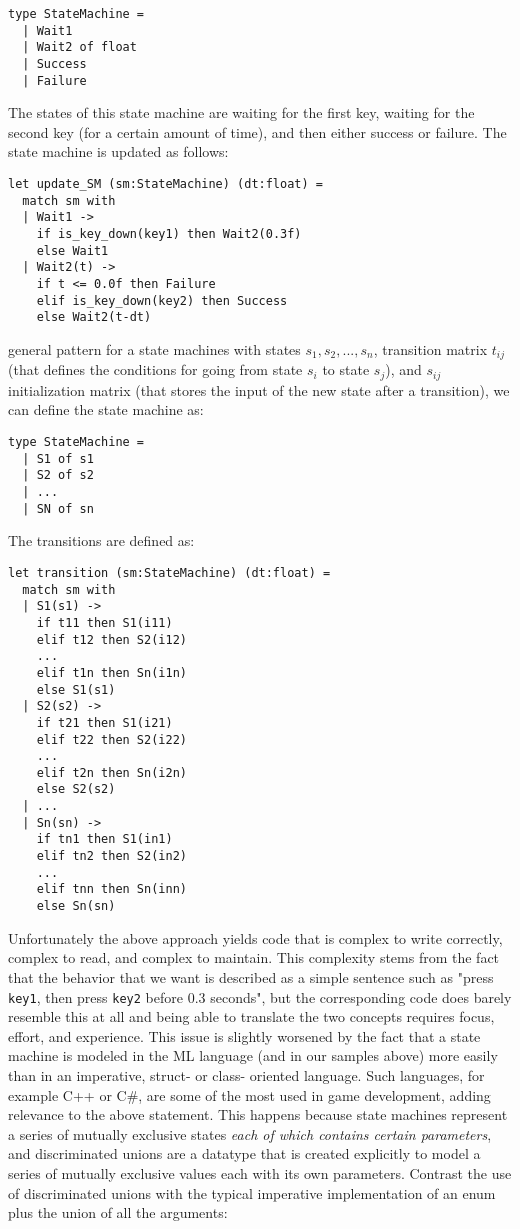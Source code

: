 \begin{lstlisting}
type StateMachine = 
  | Wait1
  | Wait2 of float
  | Success
  | Failure
\end{lstlisting}

The states of this state machine are waiting for the first key, waiting for the second key (for a certain amount of time), and then either success or failure. The state machine is updated as follows:

\begin{lstlisting}
let update_SM (sm:StateMachine) (dt:float) =
  match sm with
  | Wait1 ->
    if is_key_down(key1) then Wait2(0.3f)
    else Wait1
  | Wait2(t) ->
    if t <= 0.0f then Failure
    elif is_key_down(key2) then Success
    else Wait2(t-dt)
\end{lstlisting}

 general pattern for a state machines with states $s_1,s_2, ..., s_n$, transition matrix $t_{ij}$ (that defines the conditions for going from state $s_i$ to state $s_j$), and $s_{ij}$ initialization matrix (that stores the input of the new state after a transition), we can define the state machine as:

\begin{lstlisting}
type StateMachine = 
  | S1 of s1
  | S2 of s2
  | ...
  | SN of sn
\end{lstlisting}

The transitions are defined as:

\begin{lstlisting}
let transition (sm:StateMachine) (dt:float) =
  match sm with
  | S1(s1) -> 
    if t11 then S1(i11)
    elif t12 then S2(i12)
    ...
    elif t1n then Sn(i1n)
    else S1(s1)
  | S2(s2) -> 
    if t21 then S1(i21)
    elif t22 then S2(i22)
    ...
    elif t2n then Sn(i2n)
    else S2(s2)
  | ...
  | Sn(sn) -> 
    if tn1 then S1(in1)
    elif tn2 then S2(in2)
    ...
    elif tnn then Sn(inn)
    else Sn(sn)
\end{lstlisting}

Unfortunately the above approach yields code that is complex to write correctly, complex to read, and complex to maintain. This complexity stems from the fact that the behavior that we want is described as a simple sentence such as "press \texttt{key1}, then press \texttt{key2} before 0.3 seconds", but the corresponding code does barely resemble this at all and being able to translate the two concepts requires focus, effort, and experience. This issue is slightly worsened by the fact that a state machine is modeled in the ML language (and in our samples above) more easily than in an imperative, struct- or class- oriented language. Such languages, for example C++ or C\#, are some of the most used in game development, adding relevance to the above statement. This happens because state machines represent a series of mutually exclusive states \textit{each of which contains certain parameters}, and discriminated unions are a datatype that is created explicitly to model a series of mutually exclusive values each with its own parameters. Contrast the use of discriminated unions with the typical imperative implementation of an enum plus the union of all the arguments:

